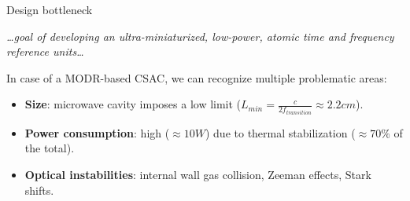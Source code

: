\begin{frame}{Design bottleneck}

    \textit{\dots goal of developing an ultra-miniaturized, low-power, atomic time and frequency reference units\dots}

    \vspace{10pt}

    In case of a MODR-based CSAC, we can recognize multiple problematic areas:

    \begin{itemize}
        \item \textbf{Size}: microwave cavity imposes a low limit ($L_{min} = \frac{c}{2f_{transition}} \approx 2.2cm$).
        \item \textbf{Power consumption}: high ($\approx 10W$) due to thermal stabilization ($\approx 70\%$ of the total).
        \item \textbf{Optical instabilities}: internal wall gas collision\footnotemark[1], Zeeman effects\footnotemark[1], Stark shifts.
    \end{itemize}


\end{frame}


